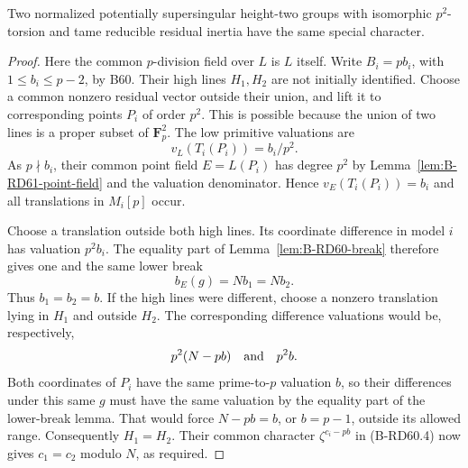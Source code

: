 \begin{proposition}
\label{prop:B-RD61-tame}
Two normalized potentially supersingular height-two groups with
isomorphic $p^2$-torsion and tame reducible residual inertia have
the same special character.
\end{proposition}
\begin{proof}
Here the common $p$-division field over $L$ is $L$ itself.
Write $B_i=pb_i$, with $1\le b_i\le p-2$, by B60.
Their high lines $H_1,H_2$ are not initially identified.
Choose a common nonzero residual vector outside their union,
and lift it to corresponding points $P_i$ of order $p^2$.
This is possible because the union of two lines is a proper
subset of $\mathbf F_p^2$. The low primitive valuations are
\[
                          v_L(T_i(P_i))=b_i/p^2.
\]
As $p\nmid b_i$, their common point field $E=L(P_i)$ has degree
$p^2$ by Lemma~\ref{lem:B-RD61-point-field} and the valuation
denominator. Hence $v_E(T_i(P_i))=b_i$ and all translations in
$M_i[p]$ occur.

Choose a translation outside both high lines. Its coordinate
difference in model $i$ has valuation $p^2b_i$.
The equality part of Lemma~\ref{lem:B-RD60-break} therefore gives
one and the same lower break
\[
                       b_E(g)=Nb_1=Nb_2.
\]
Thus $b_1=b_2=b$. If the high lines were different, choose a
nonzero translation lying in $H_1$ and outside $H_2$.
The corresponding difference valuations would be, respectively,
\[
                   p^2(N-pb)\quad\hbox{and}\quad p^2b.
\]
Both coordinates of $P_i$ have the same prime-to-$p$ valuation
$b$, so their differences under this same $g$ must have the same
valuation by the equality part of the lower-break lemma. That
would force $N-pb=b$, or $b=p-1$, outside its allowed range.
Consequently $H_1=H_2$. Their common character
$\zeta^{c_i-pb}$ in (B-RD60.4) now gives $c_1=c_2$ modulo $N$,
as required.
\end{proof}

